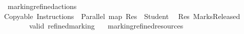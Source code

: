 \ marking{\isacharunderscore}refined{\isacharunderscore}actions{\isacharcolon}\isanewline
\ \ \ \isanewline
{}Copyable\ Instructions\ \isasymodot\ Parallel\ {\isacharparenleft}map\ {\isacharparenleft}Res\ {\isasymcirc}\ Student{\isacharparenright}\ \ \isasymrightarrow\isanewline
{}Res\ MarksReleased\isanewline
\ \ \ \ \ \ \ valid\ refined{\isachardot}marking\isanewline
\ \ \ marking{\isacharunderscore}refined{\isacharunderscore}resources\ \ 
